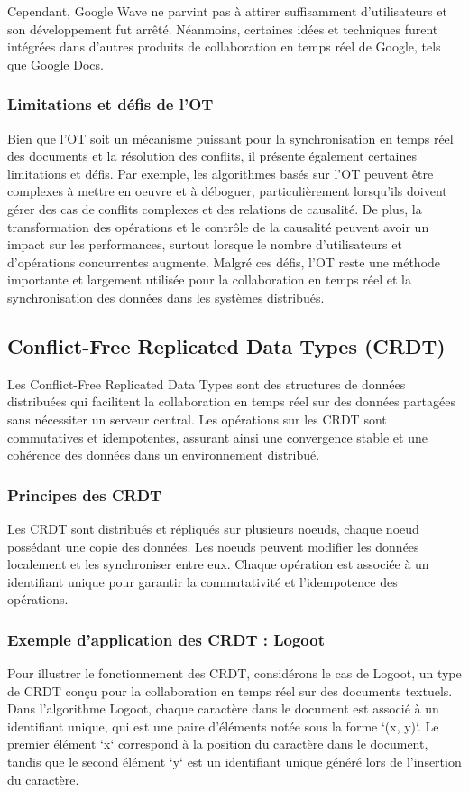 Cependant, Google Wave ne parvint pas à attirer suffisamment d'utilisateurs et son développement fut arrêté. Néanmoins, certaines idées et techniques furent intégrées dans d'autres produits de collaboration en temps réel de Google, tels que Google Docs.

\subsubsection{Limitations et défis de l'OT}
Bien que l'OT soit un mécanisme puissant pour la synchronisation en temps réel des documents et la résolution des conflits, il présente également certaines limitations et défis. Par exemple, les algorithmes basés sur l'OT peuvent être complexes à mettre en oeuvre et à déboguer, particulièrement lorsqu'ils doivent gérer des cas de conflits complexes et des relations de causalité. De plus, la transformation des opérations et le contrôle de la causalité peuvent avoir un impact sur les performances, surtout lorsque le nombre d'utilisateurs et d'opérations concurrentes augmente. Malgré ces défis, l'OT reste une méthode importante et largement utilisée pour la collaboration en temps réel et la synchronisation des données dans les systèmes distribués.

\subsection{Conflict-Free Replicated Data Types (CRDT)}
Les Conflict-Free Replicated Data Types sont des structures de données distribuées qui facilitent la collaboration en temps réel sur des données partagées sans nécessiter un serveur central. Les opérations sur les \Gls{CRDT} sont commutatives et idempotentes, assurant ainsi une convergence stable et une cohérence des données dans un environnement distribué.

\subsubsection{Principes des \Gls{CRDT}}
Les \Gls{CRDT} sont distribués et répliqués sur plusieurs noeuds, chaque noeud possédant une copie des données. Les noeuds peuvent modifier les données localement et les synchroniser entre eux. Chaque opération est associée à un identifiant unique pour garantir la commutativité et l'idempotence des opérations.

\subsubsection{Exemple d'application des \Gls{CRDT} : Logoot}
Pour illustrer le fonctionnement des \Gls{CRDT}, considérons le cas de Logoot, un type de \Gls{CRDT} conçu pour la collaboration en temps réel sur des documents textuels. Dans l'algorithme Logoot, chaque caractère dans le document est associé à un identifiant unique, qui est une paire d'éléments notée sous la forme `(x, y)`. Le premier élément `x` correspond à la position du caractère dans le document, tandis que le second élément `y` est un identifiant unique généré lors de l'insertion du caractère.


